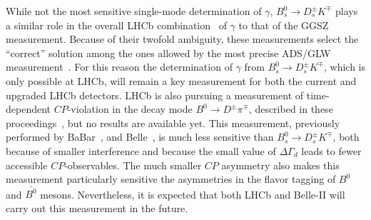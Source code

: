 While not the most sensitive single-mode determination of $\gamma$, $B^0_s \to D^\pm_s K^\mp$ plays a similar
role in the overall LHCb combination~\cite{LHCb-PAPER-2016-032} of $\gamma$ to that of the GGSZ measurement. Because of their twofold ambiguity, these measurements
select the ``correct'' solution among the ones allowed by the most precise ADS/GLW measurement~\cite{LHCb-PAPER-2016-003}. For this reason the determination
of $\gamma$ from $B^0_s \to D^\pm_s K^\mp$, which is only possible at LHCb, will remain a key measurement for both the current
and upgraded LHCb detectors. LHCb is also pursuing a measurement of time-dependent $CP$-violation in
the decay mode $B^0 \to D^\pm \pi^\mp$, described in these proceedings~\cite{BDPIPROC}, but no results are available yet.
This measurement, previously performed by BaBar~\cite{Aubert:2005yf}, \cite{Aubert:2006tw} and Belle~\cite{Bahinipati:2011yq}, \cite{Ronga:2006hv}
is much less sensitive than $B^0_s \to D^\pm_s K^\mp$, both because of smaller interference and because
the small value of $\Delta\Gamma_d$ leads to fewer accessible $CP$-observables. The much smaller $CP$ asymmetry
also makes this measurement particularly sensitive the asymmetries in the flavor tagging of $B^0$ and $\bar{B^0}$ mesons.
Nevertheless, it is expected that both LHCb and Belle-II will carry out this measurement in the future.
